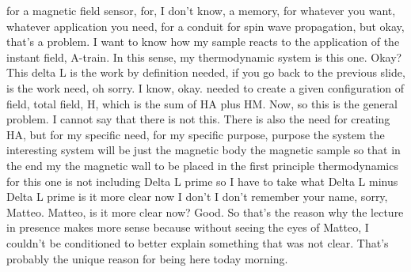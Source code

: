 for a magnetic field sensor, for, I don't know, a memory, for whatever you want, whatever application you need, for a conduit for spin wave propagation, but okay, that's a problem. I want to know how my sample reacts to the application of the instant field, A-train. In this sense, my thermodynamic system is this one. Okay? This delta L is the work by definition needed, if you go back to the previous slide, is the work need, oh sorry. I know, okay. needed to create a given configuration of field, total field, H, which is the sum of HA plus HM. Now, so this is the general problem. I cannot say that there is not this. There is also the need for creating HA, but for my specific need, for my specific purpose, purpose the system the interesting system will be just the magnetic body the magnetic sample so that in the end my the magnetic wall to be placed in the first principle thermodynamics for this one is not including Delta L prime so I have to take what Delta L minus Delta L prime is it more clear now I don't I don't remember your name, sorry, Matteo. Matteo, is it more clear now? Good. So that's the reason why the lecture in presence makes more sense because without seeing the eyes of Matteo, I couldn't be conditioned to better explain something that was not clear. That's probably the unique reason for being here today morning.
